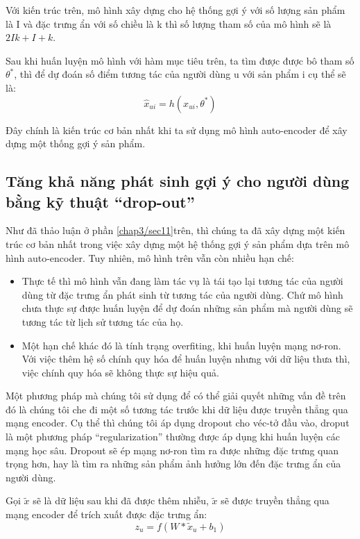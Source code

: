     Với kiến trúc trên, mô hình xây dựng cho hệ thống gợi ý với số lượng sản phẩm là I và đặc trưng ẩn với số chiều là k thì số lượng tham số của mô hình sẽ là $2Ik + I + k$.
    
    Sau khi huấn luyện mô hình với hàm mục tiêu trên, ta tìm được được bô tham số $\theta^*$, thì để dự đoán số điểm tương tác của người dùng u với sản phẩm i cụ thể sẽ là: 
    $$\widehat{x}_{ui} = h(x_{ui},\theta^*)$$

    Đây chính là kiến trúc cơ bản nhất khi ta sử dụng mô hình auto-encoder để xây dựng một thống gợi ý sản phẩm.
    


   



    \subsection{Tăng khả năng phát sinh gợi ý cho người dùng bằng kỹ thuật ``drop-out''}
    Như đã thảo luận ở phần \ref{chap3/sec11}trên, thì chúng ta đã xây dựng một kiến trúc cơ bản nhất trong việc xây dựng một hệ thống gợi ý sản phẩm dựa trên mô hình auto-encoder.
    Tuy nhiên, mô hình trên vẫn còn nhiều hạn chế: 
    \begin{itemize}
        \item Thực tế thì mô hình vẫn đang làm tác vụ là tái tạo lại tương tác của người dùng từ đặc trưng ẩn phát sinh từ tương tác của người dùng. Chứ mô hình chưa thực sự được huấn luyện để dự đoán những sản phẩm mà người dùng sẽ tương tác từ lịch sử tương tác của họ.
        \item Một hạn chế khác đó là tính trạng overfiting, khi huấn luyện mạng nơ-ron. Với việc thêm hệ số chính quy hóa để huấn luyện nhưng với dữ liệu thưa thì, việc chính quy hóa sẽ không thực sự hiệu quả.
    \end{itemize}
    
    Một phương pháp mà chúng tôi sử dụng để có thể giải quyết những vấn đề trên đó là chúng tôi che đi một số tương tác trước khi dữ liệu được truyền thẳng qua mạng encoder. 
    Cụ thể thì chúng tôi áp dụng dropout cho véc-tở đầu vào, droput là một phương pháp ``regularization'' thường được áp dụng khi huấn luyện các mạng học sâu. 
    Dropout sẽ ép mạng nơ-ron tìm ra được những đặc trưng quan trọng hơn, hay là tìm ra những sản phẩm ảnh hưởng lớn đến đặc trưng ẩn của người dùng. 
    
    Gọi $\tilde{x}$ sẽ là dữ liệu sau khi đã được thêm nhiễu, $\tilde{x}$ sẽ được truyền thẳng qua mạng encoder để trích xuất được đặc trưng ẩn:
    \begin{equation}
        \label{z_u_with_x_tilde}
        z_u = f(W * \tilde{x}_u + b_1)
    \end{equation}
    
